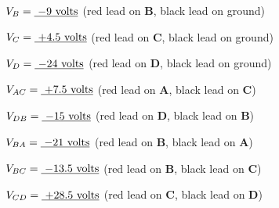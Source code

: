 \vskip 5pt

$V_B = \hbox{\underbar{ $-$9 volts}}$ (red lead on {\bf B}, black lead on ground)

\vskip 5pt

$V_C = \hbox{\underbar{ +4.5 volts}}$ (red lead on {\bf C}, black lead on ground)

\vskip 5pt

$V_D = \hbox{\underbar{ $-$24 volts}}$ (red lead on {\bf D}, black lead on ground)

\vskip 20pt

\goodbreak

$V_{AC} = \hbox{\underbar{ +7.5 volts}}$ (red lead on {\bf A}, black lead on {\bf C})

\vskip 5pt

$V_{DB} = \hbox{\underbar{ $-$15 volts}}$ (red lead on {\bf D}, black lead on {\bf B})

\vskip 5pt

$V_{BA} = \hbox{\underbar{ $-$21 volts}}$ (red lead on {\bf B}, black lead on {\bf A})

\vskip 5pt

$V_{BC} = \hbox{\underbar{ $-$13.5 volts}}$ (red lead on {\bf B}, black lead on {\bf C})

\vskip 5pt

$V_{CD} = \hbox{\underbar{ +28.5 volts}}$ (red lead on {\bf C}, black lead on {\bf D})





